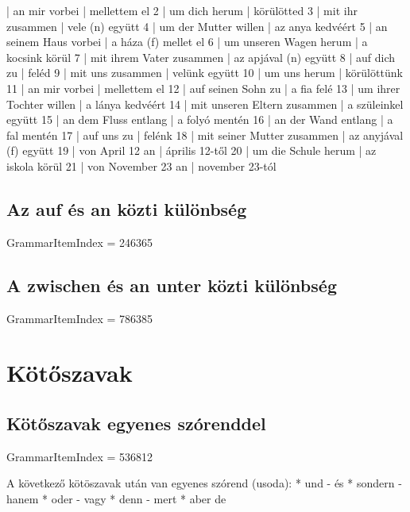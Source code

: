 \documentclass{article}
\newenvironment{desc}{\verbatim}{\endverbatim}
\newenvironment{exmp}{\verbatim}{\endverbatim}
\begin{document}
\begin{exmp}
1 | an mir vorbei | mellettem el
2 | um dich herum | körülötted
3 | mit ihr zusammen | vele (n) együtt
4 | um der Mutter willen | az anya kedvéért
5 | an seinem Haus vorbei | a háza (f) mellet el
6 | um unseren Wagen herum | a kocsink körül
7 | mit ihrem Vater zusammen | az apjával (n) együtt
8 | auf dich zu | feléd
9 | mit uns zusammen | velünk együtt
10 | um uns herum | körülöttünk
11 | an mir vorbei | mellettem el
12 | auf seinen Sohn zu | a fia felé
13 | um ihrer Tochter willen | a lánya kedvéért
14 | mit unseren Eltern zusammen | a szüleinkel együtt
15 | an dem Fluss entlang | a folyó mentén
16 | an der Wand entlang | a fal mentén
17 | auf uns zu | felénk
18 | mit seiner Mutter zusammen | az anyjával (f) együtt
19 | von April 12 an | április 12-től
20 | um die Schule herum | az iskola körül
21 | von November 23 an | november 23-tól
\end{exmp}

\subsection{Az auf és an közti különbség}

GrammarItemIndex = 246365

\subsection{A zwischen és an unter közti különbség}

GrammarItemIndex = 786385

\section{Kötőszavak}

\subsection{Kötőszavak egyenes szórenddel}

GrammarItemIndex = 536812

\begin{desc}
A következő kötöszavak után van egyenes szórend (usoda):
* und - és
* sondern - hanem
* oder - vagy
* denn - mert
* aber  de
\end{desc}
\end{document}
